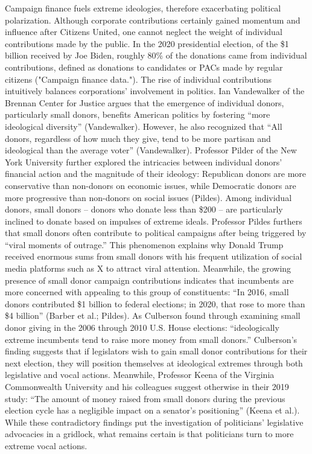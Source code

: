 \documentclass[12pt, a4paper, twoside]{article}
\begin{document}
Campaign finance fuels extreme ideologies, therefore exacerbating political polarization. Although corporate contributions certainly gained momentum and influence after Citizens United, one cannot neglect the weight of individual contributions made by the public. In the 2020 presidential election, of the \$1 billion received by Joe Biden, roughly 80\% of the donations came from individual contributions, defined as donations to candidates or PACs made by regular citizens ("Campaign finance data."). The rise of individual contributions intuitively balances corporations’ involvement in politics. Ian Vandewalker of the Brennan Center for Justice argues that the emergence of individual donors, particularly small donors, benefits American politics by fostering “more ideological diversity” (Vandewalker). However, he also recognized that “All donors, regardless of how much they give, tend to be more partisan and ideological than the average voter” (Vandewalker). Professor Pilder of the New York University further explored the intricacies between individual donors’ financial action and the magnitude of their ideology: Republican donors are more conservative than non-donors on economic issues, while Democratic donors are more progressive than non-donors on social issues (Pildes). Among individual donors, small donors – donors who donate less than \$200 – are particularly inclined to donate based on impulses of extreme ideals. Professor Pildes furthers that small donors often contribute to political campaigns after being triggered by “viral moments of outrage.” This phenomenon explains why Donald Trump received enormous sums from small donors with his frequent utilization of social media platforms such as X to attract viral attention. Meanwhile, the growing presence of small donor campaign contributions indicates that incumbents are more concerned with appealing to this group of constituents: “In 2016, small donors contributed \$1 billion to federal elections; in 2020, that rose to more than \$4 billion” (Barber et al.; Pildes). As Culberson found through examining small donor giving in the 2006 through 2010 U.S. House elections: “ideologically extreme incumbents tend to raise more money from small donors.” Culberson’s finding suggests that if legislators wish to gain small donor contributions for their next election, they will position themselves at ideological extremes through both legislative and vocal actions. Meanwhile, Professor Keena of the Virginia Commonwealth University and his colleagues suggest otherwise in their 2019 study: “The amount of money raised from small donors during the previous election cycle has a negligible impact on a senator’s positioning” (Keena et al.). While these contradictory findings put the investigation of politicians’ legislative advocacies in a gridlock, what remains certain is that politicians turn to more extreme vocal actions. 
\end{document}
